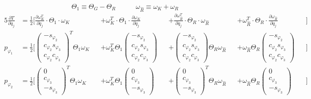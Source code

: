 \begin{equation}
\Theta_1 \equiv \Theta_G - \Theta_R \hspace{35pt} \omega_{\widehat{R}} \equiv \omega_K  + \omega_R
\end{equation}
\begin{alignat}{5}
\frac{\partial T}{\partial \dot{q}_j} &= \frac{1}{2} \bigg[ \frac{\partial \omega^T_K}{\partial \dot{q}_j} \cdot \Theta_1 \cdot \omega_K &&+ \omega^T_K \cdot \Theta_1 \cdot \frac{\partial \omega_K}{\partial \dot{q}_j}  &&+ \frac{\partial \omega_{\widehat{R}}^T}{\partial \dot{q}_j} \cdot \Theta_R \cdot \omega_{\widehat{R}} &&+ \omega_{\widehat{R}}^T \cdot \Theta_R \cdot \frac{\partial \omega_{\widehat{R}}}{\partial \dot{q}_j} &&\bigg] 
\\
p_{\varphi_1} &= \frac{1}{2}\Bigg[
\begin{pmatrix}-s_{\varphi_2} \\ c_{\varphi_2}s_{\varphi_3} \\ c_{\varphi_2}c_{\varphi_3}
\end{pmatrix}^T  \Theta_1 \omega_K &&+ \omega^T_K \Theta_1 \begin{pmatrix}-s_{\varphi_2} \\ c_{\varphi_2}s_{\varphi_3} \\ c_{\varphi_2}c_{\varphi_3}
\end{pmatrix} &&+ \begin{pmatrix}-s_{\varphi_2} \\ c_{\varphi_2}s_{\varphi_3} \\ c_{\varphi_2}c_{\varphi_3}
\end{pmatrix} \Theta_R \omega_{\widehat{R}} &&+ \omega_{\widehat{R}} \Theta_R  \begin{pmatrix}-s_{\varphi_2} \\ c_{\varphi_2}s_{\varphi_3} \\ c_{\varphi_2}c_{\varphi_3}
\end{pmatrix} &&\Bigg]
\\
p_{\varphi_2} &= \frac{1}{2} \Bigg[ \begin{pmatrix}0 \\ c_{\varphi_3} \\ -s_{\varphi_3}\end{pmatrix}^T \Theta_1 \omega_K &&+ \omega^T_K \Theta_1 \begin{pmatrix}0 \\ c_{\varphi_3} \\ -s_{\varphi_3}\end{pmatrix} &&+ \begin{pmatrix}0 \\ c_{\varphi_3} \\ -s_{\varphi_3}\end{pmatrix}^T \Theta_R \omega_{\widehat{R}} &&+ \omega_{\widehat{R}} \Theta_R \begin{pmatrix}0 \\ c_{\varphi_3} \\ -s_{\varphi_3}\end{pmatrix} &&\Bigg]

\end{alignat}
